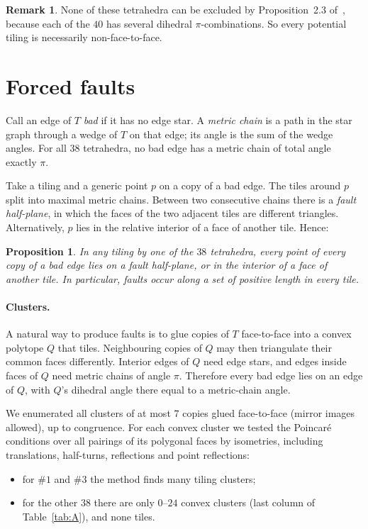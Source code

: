\documentclass[11pt]{amsart}
\newtheorem{proposition}[theorem]{Proposition}
\theoremstyle{definition}
\newtheorem{remark}[theorem]{Remark}
\begin{document}
\begin{remark}
None of these tetrahedra can be excluded by Proposition~2.3 of~\cite{CS}, because each of the $40$ has several dihedral
$\pi$-combinations. So every potential tiling is necessarily non-face-to-face.
\end{remark}

\section{Forced faults}
Call an edge of $T$ \emph{bad} if it has no edge star. A \emph{metric chain} is a path in the star graph through a wedge
of $T$ on that edge; its angle is the sum of the wedge angles. For all $38$ tetrahedra, no bad edge has a metric chain of
total angle exactly $\pi$.

Take a tiling and a generic point $p$ on a copy of a bad edge. The tiles around $p$ split into maximal metric chains.
Between two consecutive chains there is a \emph{fault half-plane}, in which the faces of the two adjacent tiles are
different triangles. Alternatively, $p$ lies in the relative interior of a face of another tile. Hence:

\begin{proposition}
In any tiling by one of the $38$ tetrahedra, every point of every copy of a bad edge lies on a fault half-plane, or in the
interior of a face of another tile. In particular, faults occur along a set of positive length in every tile.
\end{proposition}

\paragraph{Clusters.} A natural way to produce faults is to glue copies of $T$ face-to-face into a convex polytope $Q$
that tiles. Neighbouring copies of $Q$ may then triangulate their common faces differently. Interior edges of $Q$ need
edge stars, and edges inside faces of $Q$ need metric chains of angle $\pi$. Therefore every bad edge lies on an edge of
$Q$, with $Q$'s dihedral angle there equal to a metric-chain angle.

We enumerated all clusters of at most $7$ copies glued face-to-face (mirror images allowed), up to congruence. For each
convex cluster we tested the Poincar\'e conditions over all pairings of its polygonal faces by isometries, including
translations, half-turns, reflections and point reflections:
\begin{itemize}[leftmargin=1.5em]
\item for $\#1$ and $\#3$ the method finds many tiling clusters;
\item for the other $38$ there are only $0$--$24$ convex clusters (last column of Table~\ref{tab:A}), and none tiles.
\end{itemize}
\end{document}
